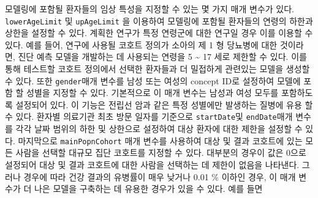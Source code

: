 \documentclass[11pt]{book}
\theoremstyle{definition}
\theoremstyle{definition}
\theoremstyle{definition}
\theoremstyle{remark}
\begin{document}
모델링에 포함될 환자들의 임상 특성을 지정할 수 있는 몇 가지 매개 변수가
있다. \texttt{lowerAgeLimit} 및 \texttt{upAgeLimit} 을 이용하여 모델링에
포함될 환자들의 연령의 하한과 상한을 설정할 수 있다. 계획한 연구가 특정
연령군에 대한 연구일 경우 이를 이용할 수 있다. 예를 들어, 연구에 사용될
코호트 정의가 소아의 제 1 형 당뇨병에 대한 것이라면, 진단 예측 모델을
개발하는 데 사용되는 연령을 5 \textasciitilde{} 17 세로 제한할 수 있다.
이를 통해 테스트할 코호트 정의에서 선택한 환자들과 더 밀접하게 관련있는
모델을 생성할 수 있다. 또한 \texttt{gender}매개 변수를 남성 또는 여성의
concept ID로 설정하여 모델에 포함 할 성별을 지정할 수 있다. 기본적으로
이 매개 변수는 남성과 여성 모두를 포함하도록 설정되어 있다. 이 기능은
전립선 암과 같은 특정 성별에만 발생하는 질병에 유용 할 수 있다. 환자별
의료기관 최초 방문 일자를 기준으로 \texttt{startDate}및
\texttt{endDate}매개 변수를 각각 날짜 범위의 하한 및 상한으로 설정하여
대상 환자에 대한 제한을 설정할 수 있다. 마지막으로
\texttt{mainPopnCohort} 매개 변수를 사용하여 대상 및 결과 코호트에 있는
모든 사람을 선택할 대규모 집단 코호트를 지정할 수 있다. 대부분의 경우이
값은 0으로 설정되어 대상 및 결과 코호트에 대한 사람을 선택하는 데 제한이
없음을 나타낸다. 그러나 경우에 따라 건강 결과의 유병률이 매우 낮거나
0.01 \% 이하인 경우, 이 매개 변수가 더 나은 모델을 구축하는 데 유용한
경우가 있을 수 있다. 예를 들면
\end{document}
